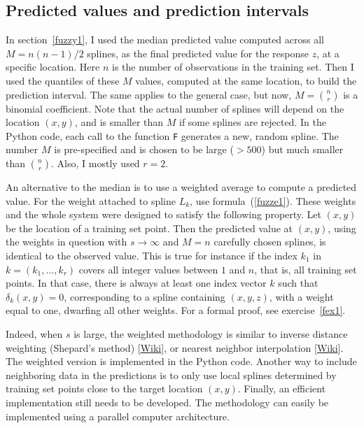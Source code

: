 \documentclass[oneside,10pt]{book}
\begin{document}
\subsection{Predicted values and prediction intervals}\label{fuzq3}

In section~\ref{fuzzy1}, I used the median predicted value computed across all $M=n(n-1)/2$ splines, as the final predicted value for the response $z$, at a specific location. Here $n$ is the number of observations in the training set. Then I used the quantiles of these $M$ values, computed at the same location, to build the prediction interval. The same applies to the general case, but now, $M= {n \choose r}$ is a binomial coefficient. Note that the actual number of splines will depend on the location $(x,y)$, and is smaller than $M$ if some splines are rejected.
In the Python code, each call to the function \texttt{F} generates a new, random spline. The number $M$ is pre-specified and is chosen to be large ($> 500$) 
but much smaller than ${n \choose r}$. Also, I mostly used $r=2$.

An alternative to the median is to use a weighted average to compute a predicted value. For the weight attached to spline $L_k$, use formula~(\ref{fuzze1}). These weights and the whole system were designed to satisfy the following property. Let $(x,y)$ be the location of a training set point.  Then the predicted value at $(x,y)$, using the weights in question with $s\rightarrow\infty$ and $M=n$ carefully chosen splines, is identical to the observed value. This is true for instance if the index $k_1$ in $k=(k_1,\dots,k_r)$ covers all integer values between $1$ and $n$, that is, all training set points. In that case, there is always at least one index vector $k$ such that $\delta_k(x,y)=0$, corresponding to a spline containing $(x,y,z)$, with a weight equal to one, dwarfing all other weights. For a formal proof, see exercise~\ref{fex1}.

Indeed, when $s$ is large, the weighted methodology is similar to 
\textcolor{index}{inverse distance weighting} (Shepard's method) [\href{https://en.wikipedia.org/wiki/Inverse_distance_weighting}{Wiki}], or 
\textcolor{index}{nearest neighbor interpolation} [\href{https://en.wikipedia.org/wiki/Nearest-neighbor_interpolation}{Wiki}]. The weighted version is implemented in the Python code.
Another way to include neighboring data in the predictions is to only use local splines determined by training set points close to the target location $(x,y)$. Finally, an efficient implementation still 
needs to be developed. The methodology can easily be implemented using a parallel computer architecture. 
\end{document}
